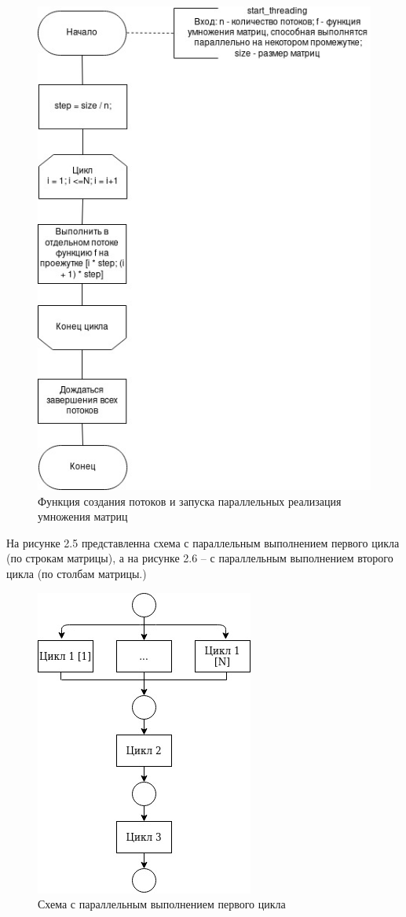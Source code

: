 \documentclass[12pt]{report}
\begin{document}
\begin{figure}[h]
	\centering
	\includegraphics[scale=1]{start_threading.jpg}
	\caption{Функция создания потоков и запуска параллельных реализация умножения матриц}
	\label{fig:mpr}
\end{figure}

На рисунке 2.5 представленна схема с параллельным выполнением первого цикла (по строкам матрицы), а на рисунке 2.6 -- с параллельным выполнением второго цикла (по столбам матрицы.)

\begin{figure}[h]
	\centering
	\includegraphics[scale=0.7]{parallel_scheme_01.jpg}
	\caption{Схема с параллельным выполнением первого цикла}
	\label{fig:mpr}
\end{figure}
\end{document}
